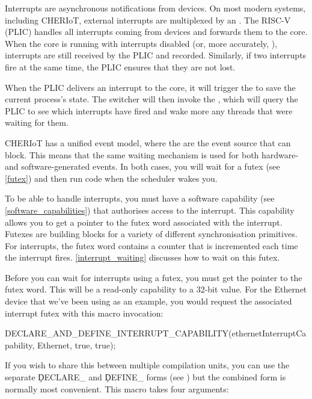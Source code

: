 Interrupts are asynchronous notifications from devices.
On most modern systems, including CHERIoT, external interrupts are multiplexed by an .
The RISC-V  (PLIC) handles all interrupts coming from devices and forwards them to the core.
When the core is running with interrupts disabled (or, more accurately, ), interrupts are still received by the PLIC and recorded.
Similarly, if two interrupts fire at the same time, the PLIC ensures that they are not lost.

When the PLIC delivers an interrupt to the core, it will trigger the  to save the current process's state.
The switcher will then invoke the , which will query the PLIC to see which interrupts have fired and wake more any threads that were waiting for them.

CHERIoT has a unified event model, where the  are the  event source that can block.
This means that the same waiting mechanism is used for both hardware- and software-generated events.
In both cases, you will wait for a futex (see \ref{futex}) and then run code when the scheduler wakes you.

To be able to handle interrupts, you must have a software capability (see \ref{software_capabilities}) that authorises access to the interrupt.
This capability allows you to get a pointer to the futex word associated with the interrupt.
Futexes are building blocks for a variety of different synchronisation primitives.
For interrupts, the futex word contains a counter that is incremented each time the interrupt fires.
\ref{interrupt_waiting} discusses how to wait on this futex.

Before you can wait for interrupts using a futex, you must get the pointer to the futex word.
This will be a read-only capability to a 32-bit value.
For the Ethernet device that we've been using as an example, you would request the associated interrupt futex with this macro invocation:

\begin{cxxsnippet}
DECLARE_AND_DEFINE_INTERRUPT_CAPABILITY(ethernetInterruptCapability, Ethernet, true, true);
\end{cxxsnippet}

If you wish to share this between multiple compilation units, you can use the separate \c{DECLARE_} and \c{DEFINE_} forms (see ) but the combined form is normally most convenient.
This macro takes four arguments:

